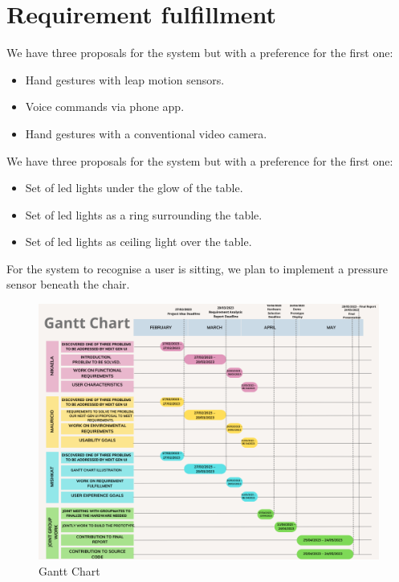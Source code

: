 \documentclass{article}
\begin{document}
\section{Requirement fulfillment}
We have three proposals for the system but with a preference for the first one:
\begin{itemize}
    \item Hand gestures with leap motion sensors.
    \item Voice commands via phone app.
    \item Hand gestures with a conventional video camera.
\end{itemize}
We have three proposals for the system but with a preference for the first one:
\begin{itemize}
    \item Set of led lights under the glow of the table.
    \item Set of led lights as a ring surrounding the table.
    \item Set of led lights as ceiling light over the table.
\end{itemize}
For the system to recognise a user is sitting, we plan to implement a pressure sensor beneath the chair.


\begin{figure}[!htb]
\centering
\includegraphics[width=\linewidth]{GanttChart.png}
\caption{Gantt Chart}
\label{}
\end{figure}



\end{document}
